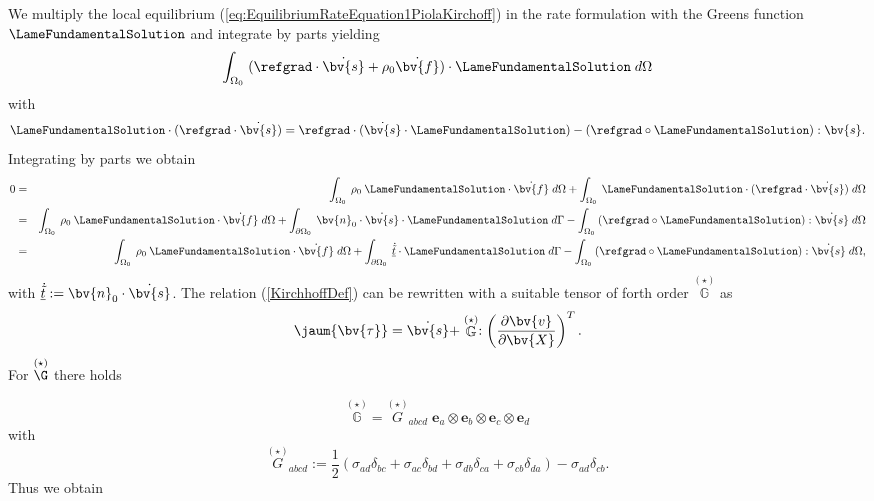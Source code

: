 We multiply  the local equilibrium (\ref{eq:EquilibriumRateEquation1PiolaKirchoff}) in the rate formulation  with the Greens function  $\LameFundamentalSolution$ and integrate by parts yielding 
\begin{equation}
\int_{{\Omega_0}}\;(\refgrad \cdot\dot{\bv{s}}+\rho_{0}\dot{\bv{f}})\cdot\LameFundamentalSolution\;d\Omega\nonumber
\end{equation} 
with 
\begin{equation}
\LameFundamentalSolution\cdot(\refgrad \cdot\dot{\bv{s}})=\refgrad \cdot(\dot{\bv{s}}\cdot\LameFundamentalSolution)-(\refgrad \circ\LameFundamentalSolution):{\bv{s}}.\nonumber
\end{equation} 
Integrating by parts we obtain 
\begin{eqnarray}
0&=&\int_{{\Omega_0}}\:\rho_{0}\:\LameFundamentalSolution\cdot\dot{\bv{f}}\;d\Omega+
\int_{{\Omega_0}}\:\LameFundamentalSolution\cdot(\refgrad \cdot\dot{\bv{s}})\;d\Omega\nonumber\\
&=&\int_{{\Omega_0}}\:\rho_{0}\:\LameFundamentalSolution\cdot\dot{\bv{f}}\;d\Omega+
\int_{\partial{\Omega_0}}\:\bv{n}_{0}\cdot\dot{\bv{s}}\cdot\LameFundamentalSolution\;d \Gamma-
\int_{{\Omega_0}}\:(\refgrad \circ\LameFundamentalSolution):\dot{\bv{s}}\;d\Omega\nonumber\\
&=&\int_{{\Omega_0}}\:\rho_{0}\:\LameFundamentalSolution\cdot\dot{\bv{f}}\;d\Omega+
\int_{\partial{\Omega_0}}\:\underline{\dot{\tilde{t}}}\cdot\LameFundamentalSolution\;d \Gamma-
\int_{{\Omega_0}}\:(\refgrad \circ\LameFundamentalSolution):\dot{\bv{s}}\;d\Omega,\nonumber
\end{eqnarray} 
with $\underline{\dot{\tilde{t}}}:=\bv{n}_{0}\cdot\dot{\bv{s}}$. The relation (\ref{KirchhoffDef}) can be rewritten with a suitable tensor of forth order $\stackrel{(\star)}{\mathbb{G}}$  as 
\begin{equation}
\jaum{\bv{\tau}}=\dot{\bv{s}}+\stackrel{(\star)}{\mathbb{G}}:\left(\dfrac{\partial \bv{v}}{\partial  \bv{X}}\right)^T.\nonumber
\end{equation} 
For  $\stackrel{(\star)}{\G}$ there holds 

\begin{equation}
\stackrel{(\star)}{\mathbb{G}}=\stackrel{(\star)}{G}_{abcd}\;\mathbf{e}_{a}\otimes\mathbf{e}_{b}\otimes\mathbf{e}_{c}\otimes\mathbf{e}_{d}
\end{equation} 
with
\begin{equation}
\stackrel{(\star)}{G}_{abcd}:=\frac{1}{2}(\sigma_{ad}\delta_{bc}+\sigma_{ac}\delta_{bd}+\sigma_{db}\delta_{ca}+\sigma_{cb}\delta_{da})-\sigma_{ad}\delta_{cb}.
\end{equation} 
Thus we obtain

